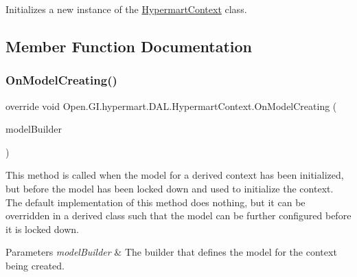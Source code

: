 Initializes a new instance of the \hyperlink{class_open_1_1_g_i_1_1hypermart_1_1_d_a_l_1_1_hypermart_context}{Hypermart\+Context} class. 



\subsection{Member Function Documentation}
\hypertarget{class_open_1_1_g_i_1_1hypermart_1_1_d_a_l_1_1_hypermart_context_a1a255d0b197dd90f76233146c608a0f1}{}\label{class_open_1_1_g_i_1_1hypermart_1_1_d_a_l_1_1_hypermart_context_a1a255d0b197dd90f76233146c608a0f1} 
\subsubsection{\texorpdfstring{On\+Model\+Creating()}{OnModelCreating()}}
{\footnotesize\ttfamily override void Open.\+G\+I.\+hypermart.\+D\+A\+L.\+Hypermart\+Context.\+On\+Model\+Creating (\begin{DoxyParamCaption}\item[{Db\+Model\+Builder}]{model\+Builder }\end{DoxyParamCaption})\hspace{0.3cm}{\ttfamily [protected]}}



This method is called when the model for a derived context has been initialized, but before the model has been locked down and used to initialize the context. The default implementation of this method does nothing, but it can be overridden in a derived class such that the model can be further configured before it is locked down. 


\begin{DoxyParams}{Parameters}
{\em model\+Builder} & The builder that defines the model for the context being created.\\
\hline
\end{DoxyParams}



